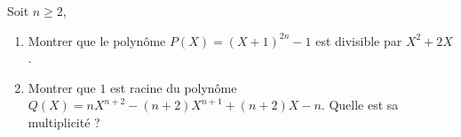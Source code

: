 \noindent Soit $n \geq 2$,

\begin{enumerate}
    \item Montrer que le polynôme $P(X) = (X + 1)^{2n} - 1$ est divisible par $X^2 + 2X$.
    \item Montrer que $1$ est racine du polynôme $Q(X) = nX^{n + 2} - (n + 2)X^{n + 1} + (n + 2)X - n$. Quelle est sa multiplicité ?
\end{enumerate}